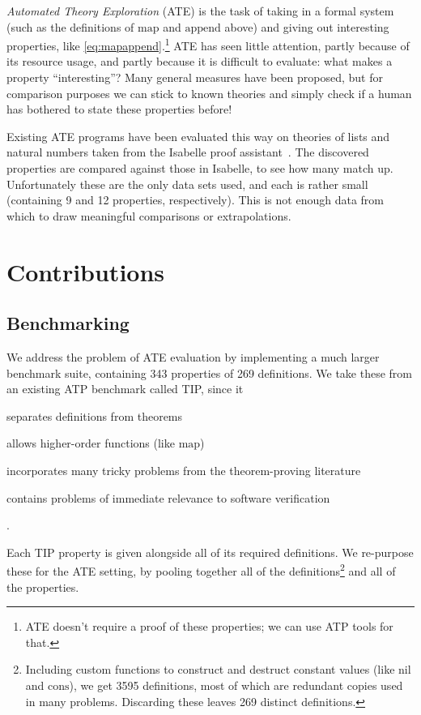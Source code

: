 \documentclass[]{default}
\newcommand{\name}[1]{\mathrm{#1}}
\begin{document}
\emph{Automated Theory Exploration} (ATE) is the task of taking in a formal
system (such as the definitions of $\name{map}$ and $\name{append}$ above) and
giving out interesting properties, like \ref{eq:mapappend}.\footnote{ATE doesn't
  require a proof of these properties; we can use ATP tools for that.} ATE has
seen little attention, partly because of its resource usage, and partly because
it is difficult to evaluate: what makes a property ``interesting''? Many general
measures have been proposed\cite{colton2000notion}, but for comparison purposes
we can stick to known theories and simply check if a human has bothered to state
these properties before!

Existing ATE programs have been evaluated this way on theories of lists and
natural numbers taken from the Isabelle proof
assistant~\cite{claessen2013automating}. The discovered properties are compared
against those in Isabelle, to see how many match up. Unfortunately these are the
only data sets used, and each is rather small (containing 9 and 12 properties,
respectively). This is not enough data from which to draw meaningful comparisons
or extrapolations.

\section{Contributions}

\subsection{Benchmarking}

We address the problem of ATE evaluation by implementing a much larger benchmark
suite, containing 343 properties of 269 definitions. We take these from an
existing ATP benchmark called TIP\cite{claessen2015tip}, since it
\begin{inlinelist}
\item separates definitions from theorems
\item allows higher-order functions (like $\name{map}$)
\item incorporates many tricky problems from the theorem-proving literature
\item contains problems of immediate relevance to software verification
\end{inlinelist}.

Each TIP property is given alongside all of its required definitions. We
re-purpose these for the ATE setting, by pooling together all of
the definitions\footnote{Including custom functions to construct and destruct
  constant values (like $\name{nil}$ and $\name{cons}$), we get 3595
  definitions, most of which are redundant copies used in many problems.
  Discarding these leaves 269 distinct definitions.} and all of the properties.
\end{document}
